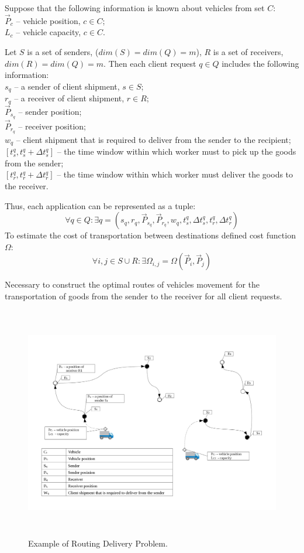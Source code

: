\documentclass[]{TAACpaper}
\begin{document}
Suppose that the following information is known about vehicles from set $C$: \\
$\vec{P}_c$ -- vehicle position, $c \in C$;\\
$L_c$ -- vehicle capacity, $c \in C$.

Let $S$ is a set of senders, ($dim(S) = dim(Q) = m$), $R$ is a set of receivers, $dim(R) = dim(Q) = m$. Then each client request $q \in Q$ includes the following information:\\
$s_q$ -- a sender of client shipment, $s \in S$; \\
$r_q$ -- a receiver of client shipment, $r \in R$; \\
$\vec{P}_{s_q}$ -- sender position;\\
$\vec{P}_{r_q}$ -- receiver position; \\
$w_q$ -- client shipment that is required to deliver from the sender to the recipient; \\
$[t_{s}^{q}, t_{s}^{q}+ \Delta{t_{s}^{q}}]$ -- the time window within which worker must to pick up the goods from the sender;\\ 
$[t_{r}^{q}, t_{r}^{q}+ \Delta{t_{r}^{q}}]$ -- the time window within which worker must deliver the goods to the receiver.
 
Thus, each application can be represented as a tuple:
\begin{equation}
\forall q \in Q: \exists q = (s_q,r_q, \vec{P}_{s_q}, \vec{P}_{r_q}, w_q, t_{s}^{q}, \Delta{t_{s}^{q}}, t_{r}^{q}, \Delta{t_{r}^{q}})
\end{equation}
To estimate the cost of transportation between destinations defined cost function $\Omega$:
\begin{equation}
\forall i,j \in S \cup R: \exists \Omega_{i,j} = \Omega(\vec{P}_i,\vec{P}_j)
\end{equation}

Necessary to construct the optimal routes of vehicles movement for the transportation of goods from the sender to the receiver for all client requests.

\begin{figure}[h]
	\hfil\includegraphics[height=4.0in]{images/scheme}\hfil
	\caption
	{
		Example of Routing Delivery Problem.
	}
	\label{aba:fig1}
\end{figure}
\end{document}
